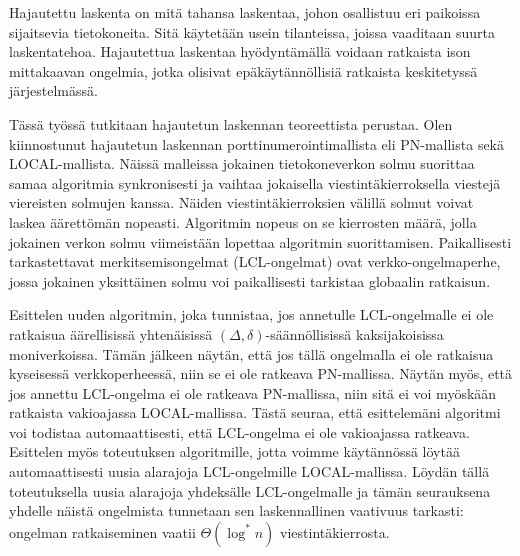 \begin{abstractpage}[finnish]
Hajautettu laskenta on mitä tahansa laskentaa, johon osallistuu eri paikoissa sijaitsevia tietokoneita.
Sitä käytetään usein tilanteissa, joissa vaaditaan suurta laskentatehoa.
Hajautettua laskentaa hyödyntämällä voidaan ratkaista ison mittakaavan ongelmia, jotka olisivat epäkäytännöllisiä ratkaista keskitetyssä järjestelmässä.

Tässä työssä tutkitaan hajautetun laskennan teoreettista perustaa.
Olen kiinnostunut hajautetun laskennan porttinumerointimallista eli PN-mallista sekä LOCAL-mallista.
Näissä malleissa jokainen tietokoneverkon solmu suorittaa samaa algoritmia synkronisesti ja vaihtaa jokaisella viestintäkierroksella viestejä viereisten solmujen kanssa.
Näiden viestintäkierroksien välillä solmut voivat laskea äärettömän nopeasti.
Algoritmin nopeus on se kierrosten määrä, jolla jokainen verkon solmu viimeistään lopettaa algoritmin suorittamisen.
Paikallisesti tarkastettavat merkitsemisongelmat (LCL-ongelmat) ovat verkko-ongelmaperhe, jossa jokainen yksittäinen solmu voi paikallisesti tarkistaa globaalin ratkaisun.

Esittelen uuden algoritmin, joka tunnistaa, jos annetulle LCL-ongelmalle ei ole ratkaisua äärellisissä yhtenäisissä $(\Delta, \delta)$-säännöllisissä kaksijakoisissa moniverkoissa.
Tämän jälkeen näytän, että jos tällä ongelmalla ei ole ratkaisua kyseisessä verkkoperheessä, niin se ei ole ratkeava PN-mallissa.
Näytän myös, että jos annettu LCL-ongelma ei ole ratkeava PN-mallissa, niin sitä ei voi myöskään ratkaista vakioajassa LOCAL-mallissa.
Tästä seuraa, että esittelemäni algoritmi voi todistaa automaattisesti, että LCL-ongelma ei ole vakioajassa ratkeava.
Esittelen myös toteutuksen algoritmille, jotta voimme käytännössä löytää automaattisesti uusia alarajoja LCL-ongelmille LOCAL-mallissa.
Löydän tällä toteutuksella uusia alarajoja yhdeksälle LCL-ongelmalle ja tämän seurauksena yhdelle näistä ongelmista tunnetaan sen laskennallinen vaativuus tarkasti: ongelman ratkaiseminen vaatii $\Theta(\log^* n)$ viestintäkierrosta.
\end{abstractpage}
